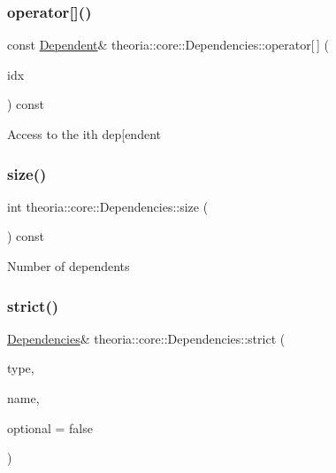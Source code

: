 \subsubsection{\texorpdfstring{operator[]()}{operator[]()}}
{\footnotesize\ttfamily const \hyperlink{structtheoria_1_1core_1_1Dependencies_1_1Dependent}{Dependent}\& theoria\+::core\+::\+Dependencies\+::operator\mbox{[}$\,$\mbox{]} (\begin{DoxyParamCaption}\item[{int}]{idx }\end{DoxyParamCaption}) const\hspace{0.3cm}{\ttfamily [inline]}}

Access to the i\textquotesingle{}th dep\mbox{[}endent \mbox{\label{classtheoria_1_1core_1_1Dependencies_a5d099bcbccf7ae14e5a373aa6be82288}} 
\subsubsection{\texorpdfstring{size()}{size()}}
{\footnotesize\ttfamily int theoria\+::core\+::\+Dependencies\+::size (\begin{DoxyParamCaption}{ }\end{DoxyParamCaption}) const\hspace{0.3cm}{\ttfamily [inline]}}

Number of dependents \mbox{\label{classtheoria_1_1core_1_1Dependencies_a7daeed943359e4290cbdcf6d0c3c57b5}} 
\subsubsection{\texorpdfstring{strict()}{strict()}}
{\footnotesize\ttfamily \hyperlink{classtheoria_1_1core_1_1Dependencies}{Dependencies}\& theoria\+::core\+::\+Dependencies\+::strict (\begin{DoxyParamCaption}\item[{const Type\+Name \&}]{type,  }\item[{const Sub\+Type\+Name \&}]{name,  }\item[{bool}]{optional = {\ttfamily false} }\end{DoxyParamCaption})\hspace{0.3cm}{\ttfamily [inline]}}

